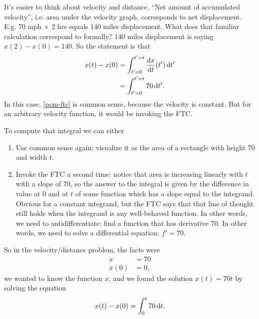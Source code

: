 It's easier to think about velocity and distance. ``Net amount of accumulated velocity'',
i.e. area under the velocity graph, corresponds to net displacement. E.g. $70$ mph $\times$ $2$
hrs equals $140$ miles displacement. What does that familiar calculation correspond to formally?
$140$ miles displacement is saying $x(2) - x(0) = 140$. So the statement is that
\begin{align}
    x(t) - x(0) &= \int_{t'=0}^{t'=t} \dxdt(t') \dt' \label{pcm-ftc} \\
                &= \int_{t'=0}^{t'=t} 70 \dt'.       \nonumber
\end{align}
In this case, \eqref{pcm-ftc} is common sense, because the velocity is constant. But for an
arbitrary velocity function, it would be invoking the FTC.

To compute that integral we can either
\begin{enumerate}
\item Use common sense again: visualize it as the area of a rectangle with height $70$ and width
  $t$.
\item Invoke the FTC a second time: notice that area is increasing linearly with $t$ with a slope
  of $70$, so the answer to the integral is given by the difference in value at $0$ and at $t$ of
  some function which has a slope equal to the integrand. Obvious for a constant integrand, but
  the FTC says that that line of thought still holds when the integrand is any well-behaved
  function. In other words, we need to antidifferentiate: find a function that has derivative
  $70$. In other words, we need to solve a differential equation: $f' = 70$.
\end{enumerate}

So in the velocity/distance problem, the facts were
\begin{align*}
    \dot{x} &= 70 \\
    x(0)    &= 0,
\end{align*}
we wanted to know the function $x$, and we found the solution $x(t) = 70t$ by solving the equation
\begin{align*}
    x(t) - x(0) = \int_0^t 70 \dt.
\end{align*}


